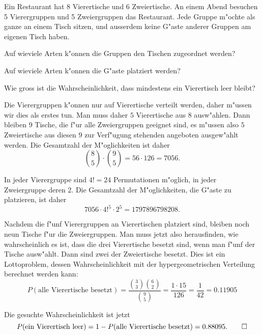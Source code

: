 Ein Restaurant hat 8 Vierertische und 6 Zweiertische.
An einem Abend besuchen 5 Vierergruppen und 5 Zweiergruppen das Restaurant.
Jede Gruppe m"ochte als ganze an einem Tisch sitzen, und ausserdem
keine G"aste anderer Gruppen am eigenen Tisch haben.
\begin{teilaufgaben}
\item Auf wieviele Arten k"onnen die Gruppen den Tischen zugeordnet
werden?
\item Auf wieviele Arten k"onnen die G"aste platziert werden?
\item Wie gross ist die Wahrscheinlichkeit, dass mindestens ein Vierertisch
leer bleibt?
\end{teilaufgaben}

\begin{loesung}
\begin{teilaufgaben}
\item
Die Vierergruppen k"onnen nur auf Vierertische verteilt werden,
daher m"ussen wir dies als erstes tun.
Man muss daher $5$ Vierertische aus $8$ ausw"ahlen.
Dann bleiben $9$ Tische, die f"ur alle Zweiergruppen geeignet sind,
es m"ussen also $5$ Zweiertische aus diesen $9$ zur Verf"ugung stehenden
angeboten ausgew"ahlt werden. 
Die Gesamtzahl der M"oglichkeiten ist daher
\[
\binom{8}{5}\cdot\binom{9}{5}=
56\cdot 126=7056.
\]
\item
In jeder Vierergruppe sind $4!=24$ Permutationen m"oglich, in jeder
Zweiergruppe deren $2$.
Die Gesamtzahl der M"oglichkeiten, die G"aste zu platzieren, ist daher
\[
7056\cdot 4!^5 \cdot 2^5=1797896798208.
\]
\item
Nachdem die f"unf Vierergruppen an Vierertischen platziert sind, bleiben
noch neun Tische f"ur die Zweiergruppen.
Man muss jetzt also herausfinden, wie wahrscheinlich es ist, dass die
drei Vierertische besetzt sind, wenn man f"unf der Tische ausw"ahlt.
Dann sind zwei der Zweiertische besetzt.
Dies ist ein Lottoproblem, dessen Wahrscheinlichkeit mit der
hypergeometrischen Verteilung berechnet werden kann:
\[
P(\text{alle Vierertische besetzt})
=
\frac{\binom{3}{3}\binom{6}{2}}{\binom{9}{5}}
=
\frac{1\cdot 15}{126}
=
\frac1{42}=0.11905
\]
\end{teilaufgaben}
Die gesuchte Wahrscheinlichkeit ist jetzt
\[
P(\text{ein Vierertisch leer})
=
1-P(\text{alle Vierertische besetzt})
=
0.88095.
\qedhere
\]
\end{loesung}

